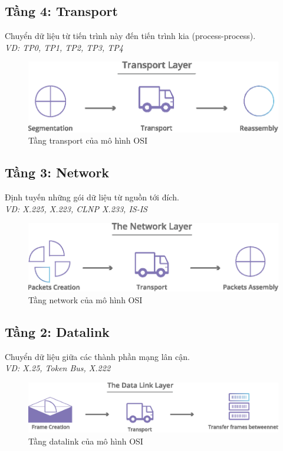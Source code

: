 \documentclass[9pt,twocolumn,twoside,lineno]{gsajnl}
\begin{document}
\subsection{Tầng 4: Transport}
Chuyển dữ liệu từ tiến trình này đến tiến trình kia (process-process).\\ \textit{VD: TP0, TP1, TP2, TP3, TP4}
\begin{figure}[h]
  \centering
  \includegraphics[scale=0.5]{q3_5}
  \caption{Tầng transport của mô hình OSI}
\end{figure}

\subsection{Tầng 3: Network}
Định tuyến những gói dữ liệu từ nguồn tới đích.\\ \textit{VD: X.225, X.223, CLNP X.233, IS-IS}
\begin{figure}[h]
  \centering
  \includegraphics[scale=0.5]{q3_6}
  \caption{Tầng network của mô hình OSI}
\end{figure}

\subsection{Tầng 2: Datalink}
Chuyển dữ liệu giữa các thành phần mạng lân cận.\\ \textit{VD: X.25, Token Bus, X.222}
\begin{figure}[h]
  \centering
  \includegraphics[scale=0.5]{q3_7}
  \caption{Tầng datalink của mô hình OSI}
\end{figure}
\end{document}
